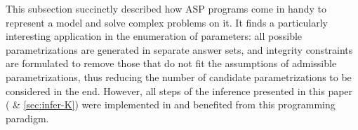 


\medskip

This subsection succinctly described how ASP programs come in handy to represent a model and solve complex problems on it.
It finds a particularly interesting application in the enumeration of parameters:
all possible parametrizations are generated in separate answer sets,
and integrity constraints are formulated to remove those that do not fit the assumptions of admissible parametrizations,
thus reducing the number of candidate parametrizations to be considered in the end.
However, all steps of the inference presented in this paper ( \& \ref{sec:infer-K})
were implemented in and benefited from this programming paradigm.
